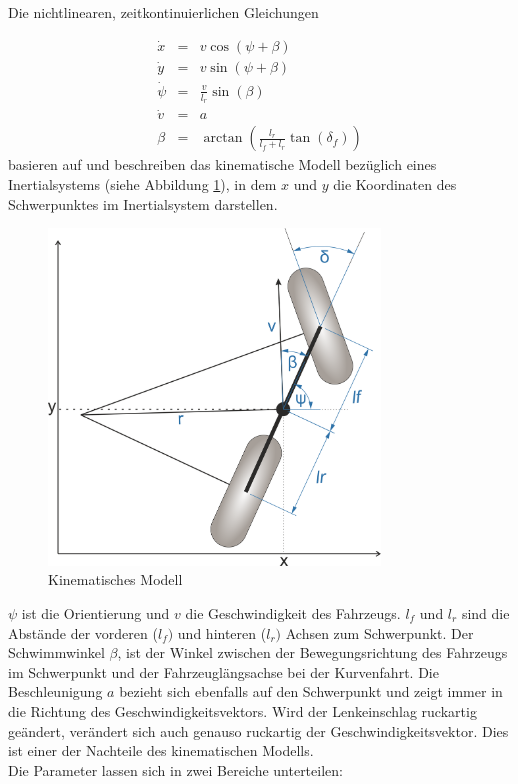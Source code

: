 \documentclass{like}
\begin{document}
Die nichtlinearen, zeitkontinuierlichen Gleichungen 

\begin{eqnarray}
\label{eq:kinDiscrete}
\dot{x}   &= &v  \cos(\psi + \beta)\\
\dot{y}   &= &v  \sin(\psi + \beta)\\
\dot{\psi} &= &\frac{v}{l_r} \sin(\beta) \\
\dot{v}    &= &a \\
\beta      &= &\arctan \left( \frac{l_r}{l_f + l_r} \tan(\delta_f) \right) \label{compute_beta}
\end{eqnarray}
basieren auf \cite{rajamani2011vehicle, 7225830} und beschreiben das kinematische Modell bezüglich eines Inertialsystems (siehe Abbildung \ref{fig:kinmodel}), in dem \(x\) und \(y\) die Koordinaten des Schwerpunktes im Inertialsystem darstellen.
\\
\begin{figure}[ht!]
	\centering
	\includegraphics[width=250pt]{Abbildungen/kinBicycle.png}
	\caption{Kinematisches Modell}
	\label{fig:kinmodel}
\end{figure}
 
\(\psi\) ist die Orientierung und \(v\) die Geschwindigkeit des Fahrzeugs. \(l_f\) und \(l_r\) sind die Abstände der vorderen (\(l_f)\) und hinteren (\(l_r)\) Achsen zum Schwerpunkt.
Der Schwimmwinkel \(\beta\), ist der Winkel  zwischen der Bewegungsrichtung des Fahrzeugs im Schwerpunkt und der Fahrzeuglängsachse bei der Kurvenfahrt. Die Beschleunigung \(a\) bezieht sich ebenfalls auf den Schwerpunkt und zeigt immer in die Richtung des Geschwindigkeitsvektors. Wird der Lenkeinschlag ruckartig geändert, verändert sich auch genauso ruckartig der Geschwindigkeitsvektor. Dies ist einer der Nachteile des kinematischen Modells.\\
Die Parameter lassen sich in zwei Bereiche unterteilen:
\end{document}
